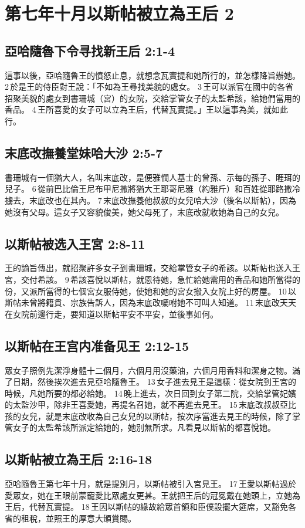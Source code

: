 \section{第七年十月以斯帖被立為王后 2}
\subsection{亞哈隨魯下令寻找新王后 2:1-4}
這事以後，亞哈隨魯王的憤怒止息，就想念瓦實提和她所行的，並怎樣降旨辦她。 2 於是王的侍臣對王說：「不如為王尋找美貌的處女。 3 王可以派官在國中的各省招聚美貌的處女到書珊城（宮）的女院，交給掌管女子的太監希該，給她們當用的香品。 4 王所喜愛的女子可以立為王后，代替瓦實提。」王以這事為美，就如此行。

\subsection{末底改撫養堂妹哈大沙 2:5-7}
書珊城有一個猶大人，名叫末底改，是便雅憫人基士的曾孫、示每的孫子、睚珥的兒子。 6 從前巴比倫王尼布甲尼撒將猶大王耶哥尼雅（約雅斤）和百姓從耶路撒冷擄去，末底改也在其內。 7 末底改撫養他叔叔的女兒哈大沙（後名以斯帖），因為她沒有父母。這女子又容貌俊美，她父母死了，末底改就收她為自己的女兒。

\subsection{以斯帖被选入王宮 2:8-11}
王的諭旨傳出，就招聚許多女子到書珊城，交給掌管女子的希該。以斯帖也送入王宮，交付希該。 9 希該喜悅以斯帖，就恩待她，急忙給她需用的香品和她所當得的份，又派所當得的七個宮女服侍她，使她和她的宮女搬入女院上好的房屋。 10 以斯帖未曾將籍貫、宗族告訴人，因為末底改囑咐她不可叫人知道。 11 末底改天天在女院前邊行走，要知道以斯帖平安不平安，並後事如何。

\subsection{以斯帖在王宫内准备见王 2:12-15}
眾女子照例先潔淨身體十二個月，六個月用沒藥油，六個月用香料和潔身之物。滿了日期，然後挨次進去見亞哈隨魯王。 13 女子進去見王是這樣：從女院到王宮的時候，凡她所要的都必給她。 14 晚上進去，次日回到女子第二院，交給掌管妃嬪的太監沙甲，除非王喜愛她，再提名召她，就不再進去見王。 15 末底改叔叔亞比孩的女兒，就是末底改收為自己女兒的以斯帖，按次序當進去見王的時候，除了掌管女子的太監希該所派定給她的，她別無所求。凡看見以斯帖的都喜悅她。

\subsection{以斯帖被立為王后 2:16-18}
亞哈隨魯王第七年十月，就是提別月，以斯帖被引入宮見王。 17 王愛以斯帖過於愛眾女，她在王眼前蒙寵愛比眾處女更甚。王就把王后的冠冕戴在她頭上，立她為王后，代替瓦實提。 18 王因以斯帖的緣故給眾首領和臣僕設擺大筵席，又豁免各省的租稅，並照王的厚意大頒賞賜。

